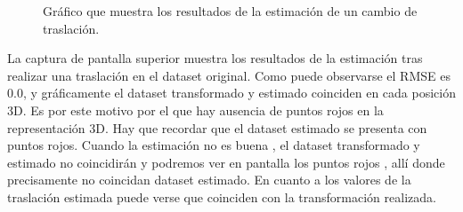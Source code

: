 \begin{figure}[H]
\begin{center}
\hspace{0.5cm}

\end{center}

\caption{Gráfico que muestra los resultados de la estimación de un cambio de traslación.}
\end{figure}

La captura de pantalla superior muestra los resultados de la estimación tras realizar una traslación en el dataset original. Como puede observarse el RMSE es 0.0, y gráficamente el dataset transformado y estimado coinciden en cada posición 3D.  Es por este motivo por el que hay ausencia de puntos rojos en la representación 3D. Hay que recordar que el dataset estimado se presenta con puntos rojos. Cuando la estimación no es buena , el dataset transformado y estimado no coincidirán y podremos ver en pantalla los puntos rojos , allí donde precisamente no coincidan dataset estimado. En cuanto a los valores de la traslación estimada puede verse que coinciden con la transformación realizada.

